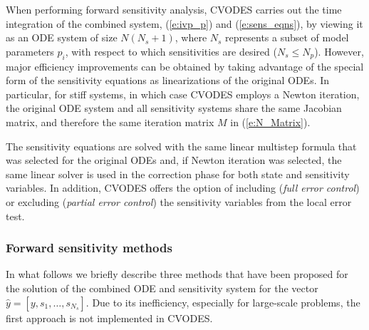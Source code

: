 When performing forward sensitivity analysis, CVODES carries out the time integration 
of the combined system, (\ref{e:ivp_p}) and (\ref{e:sens_eqns}), by viewing it as an ODE
system of size $N(N_s+1)$, where $N_s$ represents a subset of model parameters $p_i$, 
with respect to which sensitivities are desired ($N_s \le N_p$). 
However, major efficiency improvements can be obtained by taking advantage of the special 
form of the sensitivity equations as linearizations of the original ODEs. 
In particular, for stiff systems, in which case CVODES employs a Newton iteration, 
the original ODE system and all sensitivity systems share the same Jacobian matrix, 
and therefore the same iteration matrix $M$ in (\ref{e:N_Matrix}).

The sensitivity equations are solved with the same linear multistep formula that
was selected for the original ODEs and, if Newton iteration was selected, the
same linear solver is used in the correction phase for both state and sensitivity 
variables. In addition, CVODES offers the option of including
({\em full error control}) or excluding
({\em partial error control}) the sensitivity variables from the local 
error test.

\subsubsection{Forward sensitivity methods}
In what follows we briefly describe three methods that have been proposed for the 
solution of the combined ODE and sensitivity system for the vector
${\hat y} = [y, s_1, \ldots , s_{N_s}]$.
Due to its inefficiency, especially for large-scale problems, the first approach 
is not implemented in CVODES.

